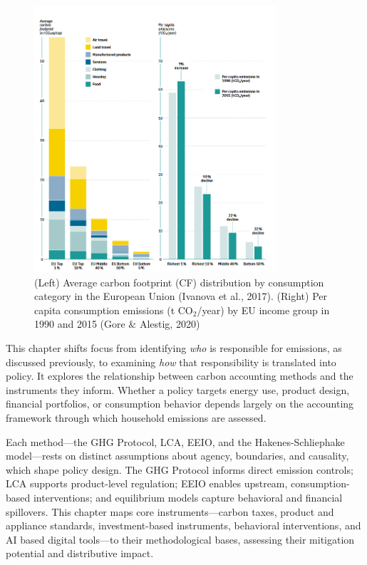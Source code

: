 \documentclass[12pt,a4paper]{article}%
\begin{document}
\begin{figure}[h]
    \centering
    \includegraphics[width=0.8\textwidth]{emission by income.png}
    \caption{\small{(Left) Average carbon footprint (CF) distribution by consumption category in the European Union (Ivanova et al., 2017). (Right) Per capita consumption emissions (t CO$_2$/year) by EU income group in 1990 and 2015 (Gore \& Alestig, 2020)}}
\end{figure}

This chapter shifts focus from identifying \textit{who} is responsible for emissions, as discussed previously, to examining \textit{how} that responsibility is translated into policy. It explores the relationship between carbon accounting methods and the instruments they inform. Whether a policy targets energy use, product design, financial portfolios, or consumption behavior depends largely on the accounting framework through which household emissions are assessed.

Each method—the GHG Protocol, LCA, EEIO, and the Hakenes-Schliephake model—rests on distinct assumptions about agency, boundaries, and causality, which shape policy design. The GHG Protocol informs direct emission controls; LCA supports product-level regulation; EEIO enables upstream, consumption-based interventions; and equilibrium models capture behavioral and financial spillovers. This chapter maps core instruments—carbon taxes, product and appliance standards, investment-based instruments, behavioral interventions, and AI based digital tools—to their methodological bases, assessing their mitigation potential and distributive impact.
\end{document}

